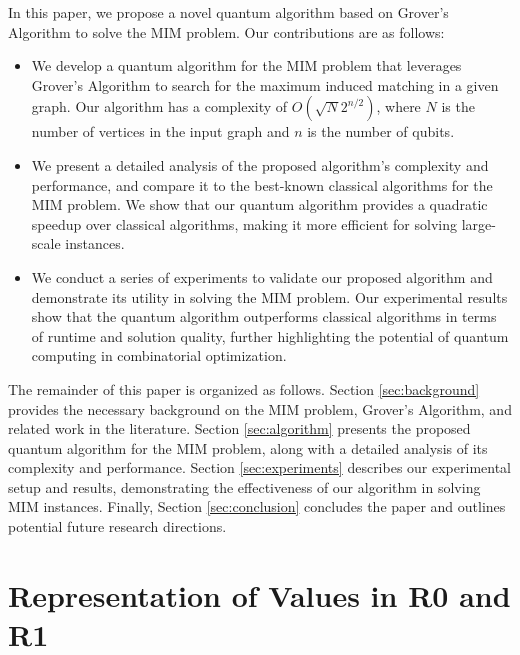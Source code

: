In this paper, we propose a novel quantum algorithm based on Grover's Algorithm to solve the MIM problem. Our contributions are as follows:

\begin{itemize}
    \item We develop a quantum algorithm for the MIM problem that leverages Grover's Algorithm to search for the maximum induced matching in a given graph. Our algorithm has a complexity of $O(\sqrt{N} 2^{n/2})$, where $N$ is the number of vertices in the input graph and $n$ is the number of qubits.
    
    \item We present a detailed analysis of the proposed algorithm's complexity and performance, and compare it to the best-known classical algorithms for the MIM problem. We show that our quantum algorithm provides a quadratic speedup over classical algorithms, making it more efficient for solving large-scale instances.
    
    \item We conduct a series of experiments to validate our proposed algorithm and demonstrate its utility in solving the MIM problem. Our experimental results show that the quantum algorithm outperforms classical algorithms in terms of runtime and solution quality, further highlighting the potential of quantum computing in combinatorial optimization.
\end{itemize}

The remainder of this paper is organized as follows. Section \ref{sec:background} provides the necessary background on the MIM problem, Grover's Algorithm, and related work in the literature. Section \ref{sec:algorithm} presents the proposed quantum algorithm for the MIM problem, along with a detailed analysis of its complexity and performance. Section \ref{sec:experiments} describes our experimental setup and results, demonstrating the effectiveness of our algorithm in solving MIM instances. Finally, Section \ref{sec:conclusion} concludes the paper and outlines potential future research directions.


\section{Representation of Values in R0 and R1}

